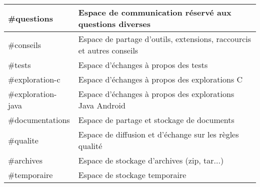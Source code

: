 \documentclass[a4paper,11pt,titlepage]{article}
\begin{document}
\begin{table}[H]
\begin{tabular}{|l|l|}
        \#questions            & Espace de communication réservé aux questions diverses                \\ \hline
        \#conseils             & Espace de partage d'outils, extensions, raccourcis et autres conseils \\ \hline
        \#tests                & Espace d'échanges à propos des tests                                  \\ \hline
        \#exploration-c        & Espace d'échanges à propos des explorations C                         \\ \hline
        \#exploration-java     & Espace d'échanges à propos des explorations Java Android              \\ \hline
        \#documentations       & Espace de partage et stockage de documents                            \\ \hline
        \#qualite              & Espace de diffusion et d'échange sur les règles qualité               \\ \hline
        \#archives             & Espace de stockage d'archives (zip, tar...)                           \\ \hline
        \#temporaire           & Espace de stockage temporaire                                         \\ \hline

    \end{tabular}
\end{table}
\end{document}
